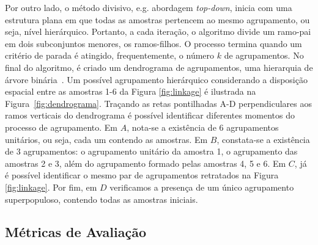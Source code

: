 \documentclass{SBCbookchapter}
\begin{document}
Por outro lado, o método divisivo, e.g. abordagem \textit{top-down}, inicia com uma estrutura plana em que todas as amostras pertencem ao mesmo agrupamento, ou seja, nível hierárquico. Portanto, a cada iteração, o algoritmo divide um ramo-pai em dois subconjuntos menores, os ramos-filhos. O processo termina quando um critério de parada é atingido, frequentemente, o número $ k $ de agrupamentos. No final do algoritmo, é criado um dendrograma de agrupamentos, uma hierarquia de árvore binária~\cite{benavent2019fca, icnc-2020-nicollas, fahad2014survey, govender2020application}. Um possível agrupamento hierárquico considerando a disposição espacial entre as amostras 1-6 da Figura \ref{fig:linkage}
é ilustrada na Figura~\ref{fig:dendrograma}. Traçando as retas pontilhadas A-D perpendiculares aos ramos verticais do dendrograma é possível identificar diferentes momentos do processo de agrupamento. Em $A$, nota-se a existência de 6 agrupamentos unitários, ou seja, cada um contendo as amostras. Em $B$, constata-se a existência de 3 agrupamentos: o agrupamento unitário da amostra 1, o agrupamento das amostras 2 e 3, além do agrupamento formado pelas amostras 4, 5 e 6. Em $C$, 
já é possível identificar o mesmo par de agrupamentos retratados na Figura \ref{fig:linkage}. Por fim, em $D$ verificamos a presença de um único agrupamento superpopuloso, contendo todas as amostras iniciais. 

\subsection{Métricas de Avaliação}
\label{subsec:metricasdeavaliação}
\end{document}
